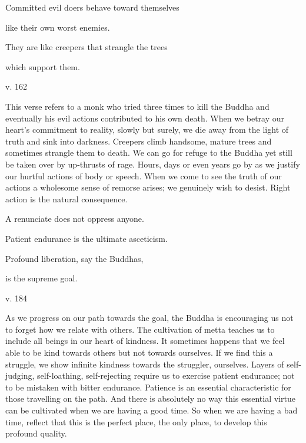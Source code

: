 \documentclass[a4paper,portrait,12pt]{article}
\begin{document}
Committed evil doers behave toward themselves


like their own worst enemies.


They are like creepers that strangle the trees


which support them.





v. 162





This verse refers to a monk who tried three times to kill the Buddha and eventually his evil actions contributed to his own death. When we betray our heart's commitment to reality, slowly but surely, we die away from the light of truth and sink into darkness. Creepers climb handsome, mature trees and sometimes strangle them to death. We can go for refuge to the Buddha yet still be taken over by up-thrusts of rage. Hours, days or even years go by as we justify our hurtful actions of body or speech. When we come to see the truth of our actions a wholesome sense of remorse arises; we genuinely wish to desist. Right action is the natural consequence.














A renunciate does not oppress anyone.


Patient endurance is the ultimate asceticism.


Profound liberation, say the Buddhas, 


is the supreme goal.





v. 184 





As we progress on our path towards the goal, the Buddha is encouraging us not to forget how we relate with others. The cultivation of metta teaches us to include all beings in our heart of kindness. It sometimes happens that we feel able to be kind towards others but not towards ourselves. If we find this a struggle, we show infinite kindness towards the struggler, ourselves. Layers of self-judging, self-loathing, self-rejecting require us to exercise patient endurance; not to be mistaken with bitter endurance. Patience is an essential characteristic for those travelling on the path. And there is absolutely no way this essential virtue can be cultivated when we are having a good time. So when we are having a bad time, reflect that this is the perfect place, the only place, to develop this profound quality.
\end{document}
